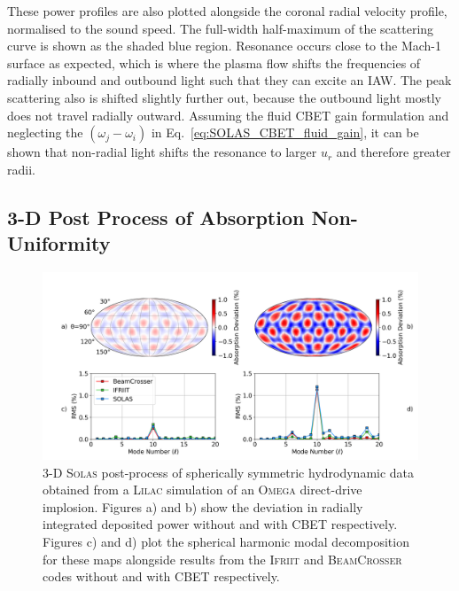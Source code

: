 These power profiles are also plotted alongside the coronal radial velocity profile, normalised to the sound speed.
The full-width half-maximum of the scattering curve is shown as the shaded blue region.
Resonance occurs close to the Mach-1 surface as expected, which is where the plasma flow shifts the frequencies of radially inbound and outbound light such that they can excite an \ac{IAW}.
The peak scattering also is shifted slightly further out, because the outbound light mostly does not travel radially outward.
Assuming the fluid \ac{CBET} gain formulation and neglecting the $(\omega_j-\omega_i)$ in Eq.~\ref{eq:SOLAS_CBET_fluid_gain}, it can be shown that non-radial light shifts the resonance to larger $u_r$ and therefore greater radii.

\subsection{3-D Post Process of Absorption Non-Uniformity}%
\label{sec:SOLAS_IFRIIT_test}

\begin{figure}[t!]
    \includegraphics[width=1.0\linewidth]{Numerics/Images/DepositionAsymmetries_mollweide_xy32.png}
    \centering
    \caption{3-D \textsc{Solas} post-process of spherically symmetric hydrodynamic data obtained from a \textsc{Lilac} simulation of an \textsc{Omega} direct-drive implosion.
    Figures a) and b) show the deviation in radially integrated deposited power without and with \ac{CBET} respectively.
    Figures c) and d) plot the spherical harmonic modal decomposition for these maps alongside results from the \textsc{Ifriit} and \textsc{BeamCrosser} codes without and with \ac{CBET} respectively.}%
    \label{fig:SOLAS_qpR_IFRIIT_test}
\end{figure}

